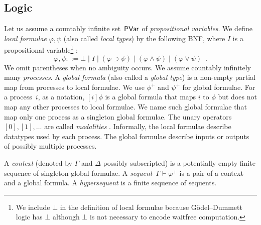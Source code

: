 \subsection{Logic}

\newcommand{\m}[1]{{#1}^+}

Let us assume a countably infinite set~$\mathsf{PVar}$ of \textit{propositional
variables}.  We define \textit{local
formulae}
$\varphi, \psi$ (also called \textit{local types}) by the following BNF, where $I$ is a propositional
variable\footnote{We include $\bot$ in the definition of local formulae
because G\"odel--Dummett logic has
$\bot$ although $\bot$ is not necessary to encode waitfree computation.}%
:
\[
 \varphi,\psi ::= \bot \mid I \mid (\varphi\supset\psi) \mid (\varphi\wedge\psi) \mid
 (\varphi\vee\psi)\enspace.
\]
We omit parentheses when no ambiguity occurs.
We assume countably infinitely many \textit{processes}.
A \textit{global formula}
(also called a \textit{global type})
is a non-empty partial map from processes to local
formulae.
We use $\m\phi$ and $\m\psi$ for global formulae.  For a process~$i$,
as a notation, $[i]\phi$ is a global formula that maps $i$ to $\phi$ but
does not map any other processes to local formulae.
We name such global formulae that map only one process as a singleton
global formulae.
The unary operators $[0], [1],\ldots$ are called \textit{modalities}%
.
Informally, the local formulae describe datatypes used by each process.
The global formulae describe inputs or outputs of possibly multiple
processes.

A \textit{context} (denoted by $\Gamma$ and $\Delta$ possibly
subscripted) is a potentially empty
finite sequence of singleton global formulae.
A \textit{sequent}~$\Gamma\vdash\m\varphi$ is a pair of a
context and a
global formula.
A \textit{hypersequent} is a finite sequence of sequents.

